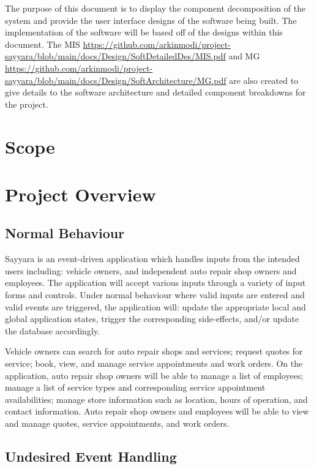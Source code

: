 \documentclass[12pt, titlepage]{article}
\begin{document}
The purpose of this document is to display the component decomposition of the system and provide
the user interface designs of the software being built. The implementation of the software will be
based off of the designs within this document. The MIS
\url{https://github.com/arkinmodi/project-sayyara/blob/main/docs/Design/SoftDetailedDes/MIS.pdf}
and MG
\url{https://github.com/arkinmodi/project-sayyara/blob/main/docs/Design/SoftArchitecture/MG.pdf}
are also created to give details to the software architecture and detailed component breakdowns for
the project.

\section{Scope}


\section{Project Overview}

\subsection{Normal Behaviour}
Sayyara is an event-driven application which handles inputs from the intended users including:
vehicle owners, and independent auto repair shop owners and employees. The application will accept
various inputs through a variety of input forms and controls. Under normal behaviour where valid
inputs are entered and valid events are triggered, the application will: update the appropriate
local and global application states, trigger the corresponding side-effects, and/or update the
database accordingly.

Vehicle owners can search for auto repair shops and services; request quotes for service; book,
view, and manage service appointments and work orders. On the application, auto repair shop owners
will be able to manage a list of employees; manage a list of service types and corresponding
service appointment availabilities; manage store information such as location, hours of operation,
and contact information. Auto repair shop owners and employees will be able to view and manage
quotes, service appointments, and work orders.

\subsection{Undesired Event Handling}
\end{document}
